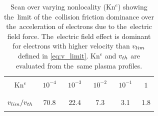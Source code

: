 
\begin{table}
\begin{center}
  \begin{tabular}{c|ccccc}
    \hline\hline\\
    Kn$^e$ & $\,\,10^{-4}\,\,$ & $\,\,10^{-3}\,\,$ & $\,\,10^{-2}\,\,$ & $\,\,10^{-1}\,\,$ & $\,\,1\,\,$ \\\\
    \hline\\
    $v_{lim} / v_{th}$ & 70.8 & 22.4 & 7.3 & 3.1 & 1.8\\\\
    \hline\hline
  \end{tabular}
  \caption{
  Scan over varying nonlocality (Kn$^e$) showing the~limit of 
  the~collision friction dominance over the~acceleration of electrons 
  due to the~electric field force. The~electric field effect is dominant
  for electrons with higher velocity than $v_{lim}$ defined in 
  \eqref{eq:v_limit}. Kn$^e$ and $v_{th}$ are evaluated from the~same 
  plasma profiles.
  }
\label{tab:vlim}
\end{center}
\end{table}

